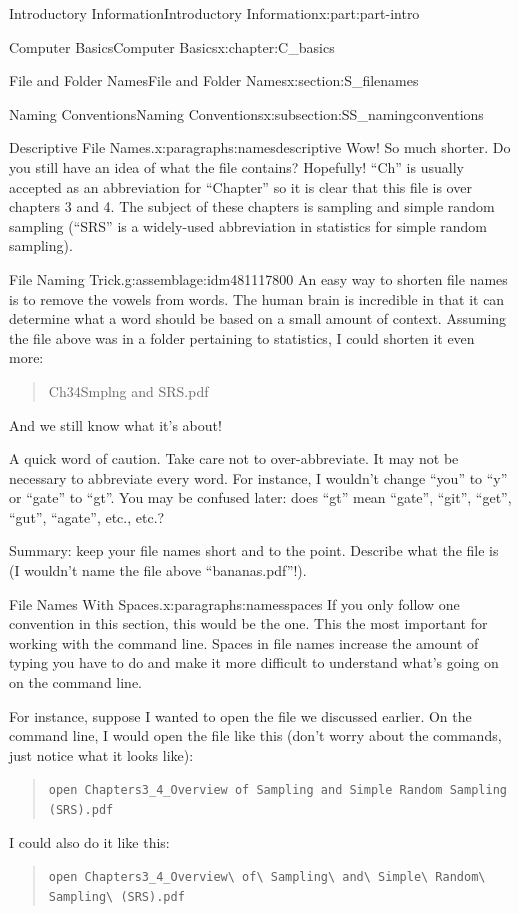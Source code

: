 \documentclass[oneside,10pt,]{book}
\newcommand{\mono}[1]{\texttt{#1}}
\begin{document}
\begin{partptx}{Introductory Information}{}{Introductory Information}{}{}{x:part:part-intro}
\begin{chapterptx}{Computer Basics}{}{Computer Basics}{}{}{x:chapter:C_basics}
\begin{sectionptx}{File and Folder Names}{}{File and Folder Names}{}{}{x:section:S_filenames}
\begin{subsectionptx}{Naming Conventions}{}{Naming Conventions}{}{}{x:subsection:SS_namingconventions}
\begin{paragraphs}{Descriptive File Names.}{x:paragraphs:namesdescriptive}
 Wow! So much shorter. Do you still have an idea of what the file contains? Hopefully! ``Ch'' is usually accepted as an abbreviation for ``Chapter'' so it is clear that this file is over chapters 3 and 4. The subject of these chapters is sampling and simple random sampling (``SRS'' is a widely-used abbreviation in statistics for simple random sampling).%
\begin{assemblage}{File Naming Trick.}{g:assemblage:idm481117800}%
An easy way to shorten file names is to remove the vowels from words. The human brain is incredible in that it can determine what a word should be based on a small amount of context. Assuming the file above was in a folder pertaining to statistics, I could shorten it even more: \begin{quote}%
Ch3\textunderscore{}4\textunderscore{}Smplng and SRS.pdf\end{quote}
 And we still know what it's about!%
\par
A quick word of caution. Take care not to over-abbreviate. It may not be necessary to abbreviate every word. For instance, I wouldn't change ``you'' to ``y'' or ``gate'' to ``gt''. You may be confused later: does ``gt'' mean ``gate'', ``git'', ``get'', ``gut'', ``agate'', etc., etc.?%
\end{assemblage}
Summary: keep your file names short and to the point. Describe what the file is (I wouldn't name the file above ``bananas.pdf''!).%
\end{paragraphs}%
\begin{paragraphs}{File Names With Spaces.}{x:paragraphs:namesspaces}%
%
If you only follow one convention in this section, this would be the one. This the most important for working with the command line. Spaces in file names increase the amount of typing you have to do and make it more difficult to understand what's going on on the command line.%
\par
For instance, suppose I wanted to open the file we discussed earlier. On the command line, I would open the file like this (don't worry about the commands, just notice what it looks like): \begin{quote}%
\mono{open \textquotesingle{}Chapters3\_4\_Overview of Sampling and Simple Random Sampling (SRS).pdf\textquotesingle{}}\end{quote}
 I could also do it like this: \begin{quote}%
\mono{open Chapters3\_4\_Overview\textbackslash{} of\textbackslash{} Sampling\textbackslash{} and\textbackslash{} Simple\textbackslash{} Random\textbackslash{} Sampling\textbackslash{} (SRS).pdf}\end{quote}

\end{paragraphs}
\end{subsectionptx}
\end{sectionptx}
\end{chapterptx}
\end{partptx}
\end{document}
